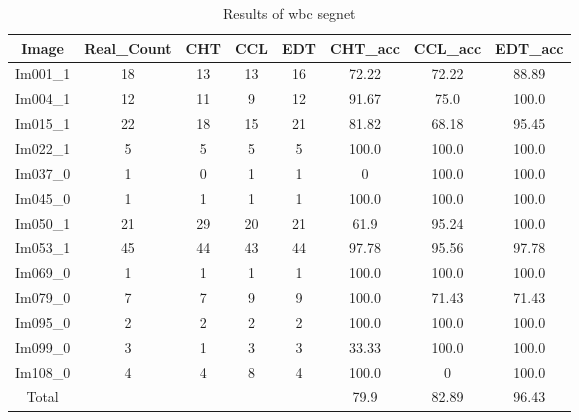 \begin{table}[H]
\centering
\begin{tabular}{|c|c|c|c|c|c|c|c|}
\hline
 \textbf{Image} & \textbf{Real\_Count} & \textbf{CHT} & \textbf{CCL} & \textbf{EDT} & \textbf{CHT\_acc} & \textbf{CCL\_acc} & \textbf{EDT\_acc} \\ \hline
 Im001\_1 & 18 & 13 & 13 & 16 & 72.22 & 72.22 & 88.89 \\ 
 Im004\_1 & 12 & 11 & 9 & 12 & 91.67 & 75.0 & 100.0 \\ 
 Im015\_1 & 22 & 18 & 15 & 21 & 81.82 & 68.18 & 95.45 \\ 
 Im022\_1 & 5 & 5 & 5 & 5 & 100.0 & 100.0 & 100.0 \\ 
 Im037\_0 & 1 & 0 & 1 & 1 & 0 & 100.0 & 100.0 \\ 
 Im045\_0 & 1 & 1 & 1 & 1 & 100.0 & 100.0 & 100.0 \\ 
 Im050\_1 & 21 & 29 & 20 & 21 & 61.9 & 95.24 & 100.0 \\ 
 Im053\_1 & 45 & 44 & 43 & 44 & 97.78 & 95.56 & 97.78 \\ 
 Im069\_0 & 1 & 1 & 1 & 1 & 100.0 & 100.0 & 100.0 \\ 
 Im079\_0 & 7 & 7 & 9 & 9 & 100.0 & 71.43 & 71.43 \\ 
 Im095\_0 & 2 & 2 & 2 & 2 & 100.0 & 100.0 & 100.0 \\ 
 Im099\_0 & 3 & 1 & 3 & 3 & 33.33 & 100.0 & 100.0 \\ 
 Im108\_0 & 4 & 4 & 8 & 4 & 100.0 & 0 & 100.0 \\ \hline
 Total &  &  &  &  & 79.9 & 82.89 & 96.43 \\ 

\hline
\end{tabular}
\caption{Results of wbc segnet}
\label{Results of wbc segnet}
\end{table}
